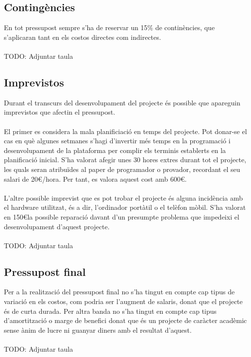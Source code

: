 \subsection{Contingències}

En tot pressupost sempre s’ha de reservar un 15\% de continències, que s’aplicaran tant en els costos directes com indirectes.
\\\\
TODO: Adjuntar taula

\subsection{Imprevistos}

Durant el transcurs del desenvolupament del projecte és possible que apareguin imprevistos que afectin el pressupost.
\\\\
El primer es considera la mala planificiació en temps del projecte. Pot donar-se el cas en què algunes setmanes s’hagi d’invertir més temps en la programació i desenvolupament de la plataforma per complir els terminis establerts en la planificació inicial. S’ha valorat afegir unes 30 hores extres durant tot el projecte, les quals seran atribuïdes al paper de programador o provador, recordant el seu salari de 20\euro/hora. Per tant, es valora aquest cost amb 600\euro.
\\\\
L’altre possible imprevist que es pot trobar el projecte és alguna incidència amb el hardware utilitzat, és a dir, l’ordinador portàtil o el telèfon mòbil. S’ha valorat en 150\euro\space la possible reparació davant d’un presumpte problema que impedeixi el desenvolupament d’aquest projecte.
\\\\
TODO: Adjuntar taula

\subsection{Pressupost final}

Per a la realització del pressupost final no s’ha tingut en compte cap tipus de variació en els costos, com podria ser l’augment de salaris, donat que el projecte és de curta durada. Per altra banda no s’ha tingut en compte cap tipus d’amortització o marge de benefici donat que és un projecte de caràcter acadèmic sense ànim de lucre ni guanyar diners amb el resultat d’aquest.
\\\\
TODO: Adjuntar taula

